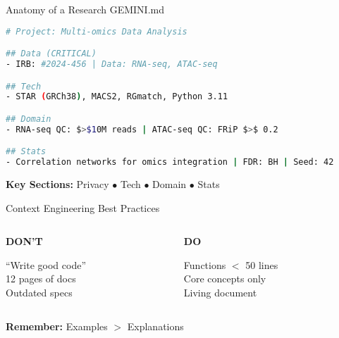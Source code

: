\documentclass[aspectratio=169]{beamer}
\begin{document}
\begin{frame}[fragile]{Anatomy of a Research GEMINI.md}
  \begin{lstlisting}[language=bash, basicstyle=\small\ttfamily]
# Project: Multi-omics Data Analysis

## Data (CRITICAL)
- IRB: #2024-456 | Data: RNA-seq, ATAC-seq

## Tech
- STAR (GRCh38), MACS2, RGmatch, Python 3.11

## Domain
- RNA-seq QC: $>$10M reads | ATAC-seq QC: FRiP $>$ 0.2

## Stats
- Correlation networks for omics integration | FDR: BH | Seed: 42
  \end{lstlisting}

  \vspace{0.3cm}
  \centering
  \normalsize
  \textbf{Key Sections:} Privacy $\bullet$ Tech $\bullet$ Domain $\bullet$ Stats
\end{frame}

\begin{frame}{Context Engineering Best Practices}
  \begin{columns}[T]
    \begin{column}{0.48\textwidth}
      \centering
      \large\bfseries
      \textcolor{conesaOrange}{DON'T}

      \vspace{0.3cm}
      \normalsize
      ``Write good code''\\
      \vspace{0.3cm}
      12 pages of docs\\
      \vspace{0.3cm}
      Outdated specs
    \end{column}
    \begin{column}{0.48\textwidth}
      \centering
      \large\bfseries
      \textcolor{conesaTeal}{DO}

      \vspace{0.3cm}
      \normalsize
      Functions $<$ 50 lines\\
      \vspace{0.3cm}
      Core concepts only\\
      \vspace{0.3cm}
      Living document
    \end{column}
  \end{columns}

  \vspace{0.8cm}
  \centering
  \normalsize
  \textbf{Remember:} Examples $>$ Explanations
\end{frame}
\end{document}

